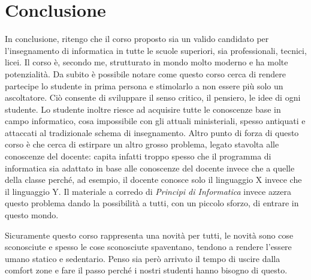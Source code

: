 \documentclass[11pt,a4paper]{article}
\begin{document}
\section{Conclusione}

In conclusione, ritengo che il corso proposto sia un valido candidato
per l'insegnamento di informatica in tutte le scuole superiori, sia 
professionali, tecnici, licei. Il corso è, secondo me, strutturato
in mondo molto moderno e ha molte potenzialità. Da subito è possibile
notare come questo corso cerca di rendere partecipe lo studente in
prima persona e stimolarlo a non essere più solo un ascoltatore. 
Ciò consente di sviluppare il senso critico, il pensiero, le idee 
di ogni studente.
Lo studente inoltre riesce ad acquisire tutte le conoscenze base in
campo informatico, cosa impossibile con gli attuali ministeriali,
spesso antiquati e attaccati al tradizionale schema di insegnamento.
Altro punto di forza di questo corso è che cerca di estirpare un 
altro grosso problema, legato stavolta alle conoscenze del docente: 
capita infatti troppo spesso che il programma di informatica sia
adattato in base alle conoscenze del docente invece che a quelle 
della classe perché, ad esempio, il docente conosce solo il 
linguaggio X invece che il linguaggio Y. Il materiale a corredo di
\emph{Principi di Informatica} invece azzera questo problema dando 
la possibilità a tutti, con un piccolo sforzo, di entrare in questo
mondo.

Sicuramente questo corso rappresenta una novità per tutti, le novità sono cose sconosciute e spesso le cose sconosciute spaventano, tendono a rendere l'essere umano statico e sedentario. Penso sia però arrivato il tempo di uscire dalla comfort zone e fare il passo perché i nostri studenti hanno bisogno di questo.

\nocite{CodeOrg} \nocite{ProgrammaIlFuturo} \nocite{BJC} \nocite{MichaelLodi} \nocite{EnricoNardelli}
\printbibliography
\end{document}
